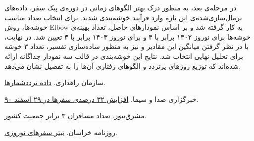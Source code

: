 \documentclass[a4paper, 12pt]{article}
\begin{document}
در مرحله‌ی بعد، به منظور درک بهتر الگوهای زمانی در دوره‌ی پیک سفر، داده‌های نرمال‌سازی‌شده‌ی این بازه وارد فرآیند خوشه‌بندی شدند. برای انتخاب تعداد مناسب خوشه‌ها، روش Elbow به کار گرفته شد و بر اساس نمودارهای حاصل، تعداد بهینه‌ی خوشه‌ها برای نوروز ۱۴۰۲ برابر با ۴ و برای نوروز ۱۴۰۳ برابر با ۳ تعیین شد. در نهایت، با در نظر گرفتن میانگین این مقادیر و نیز به منظور ساده‌سازی تفسیر، تعداد ۳ خوشه برای تحلیل نهایی انتخاب شد. نتایج این خوشه‌بندی در قالب سه نمودار جداگانه ارائه شده‌اند که توزیع روزهای پرتردد و الگوهای رفتاری آن‌ها را به تفصیل نشان می‌دهد.

\begin{thebibliography}{9}
سازمان راهداری.
\href{https://141.ir/}{داده ترددشمارها}.

    خبرگزاری صدا و سیما. 
    \href{https://www.iribnews.ir/fa/news/4498}{افزایش ۳۲ درصدی سفرها در ۲۹ اسفند ۹۰}.
    
    مشرق‌نیوز. 
    \href{https://www.mashreghnews.ir/news/109287}{تعداد مسافران ۳ برابر جمعیت کشور}.
    
    روزنامه خراسان. 
    \href{https://www.khorasannews.com/Newspaper/Page/18087/1/378855/0}{تیتر سفرهای نوروزی}.
    
\end{thebibliography}

    
\end{document}
